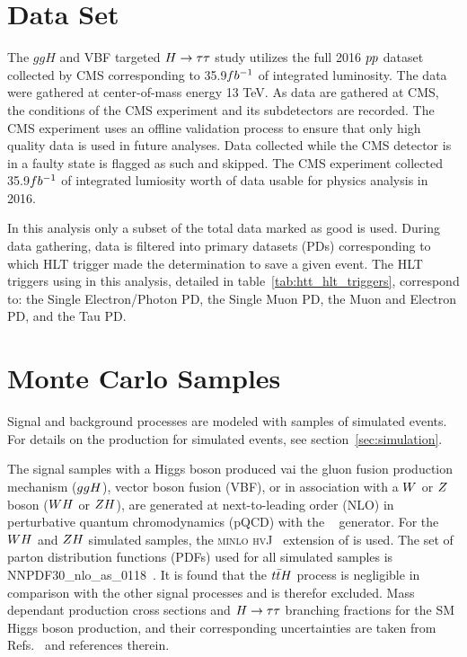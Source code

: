 \section{Data Set}
\label{sec:htt_dataset}
The $ggH$ and VBF targeted $H\to\tau\tau$ study utilizes the full 2016 $pp$ dataset collected by CMS corresponding to 35.9$fb^{-1}$ 
of integrated luminosity.  The data were gathered at center-of-mass energy 13 TeV.
As data are gathered at CMS, the conditions of the CMS experiment and its subdetectors are recorded.
The CMS experiment uses an offline validation process to ensure that only high quality
data is used in future analyses.  Data collected while the CMS detector is in a faulty state
is flagged as such and skipped. The CMS experiment collected 35.9$fb^{-1}$ of integrated 
lumiosity worth of data usable for physics analysis in 2016.

In this analysis only a subset of the total data marked as good is used.  During data
gathering, data is filtered into primary datasets (PDs) corresponding to which HLT trigger
made the determination to save a given event.  The HLT triggers using in this analysis,
detailed in table~\ref{tab:htt_hlt_triggers}, correspond to: the Single Electron/Photon
PD, the Single Muon PD, the Muon and Electron PD, and the Tau PD.



\section{Monte Carlo Samples}
\label{sec:htt_mc_samples}
Signal and background processes are modeled with samples of simulated events.
For details on the production for simulated events, see section~\ref{sec:simulation}.

The signal samples with a Higgs boson produced vai the gluon fusion production
mechanism ($ggH$), vector boson fusion (VBF), or in association with a $W$ or $Z$ boson ($WH$ or $ZH$), 
are generated at next-to-leading order (NLO) in perturbative quantum chromodynamics (pQCD) 
with the ~\cite{Nason:2004rx,Frixione:2007vw, Alioli:2010xd, Alioli:2010xa, Alioli:2008tz} 
generator. For the $WH$ and $ZH$ simulated samples, the \textsc{minlo hvJ}~\cite{Luisoni:2013kna} 
extension of  is used. The set of parton distribution functions (PDFs) used for all
simulated samples is NNPDF30\_nlo\_as\_0118~\cite{Ball:2011uy}. It is found that the $t\bar{t}H$ 
process is negligible in comparison with the other signal processes and is therefor excluded.
Mass dependant production cross sections and $H\to\tau\tau$ branching fractions for the SM Higgs boson production, 
and their corresponding uncertainties are taken from 
Refs.~\cite{deFlorian:2016spz,Denner:2011mq,Ball:2011mu} and references therein.

